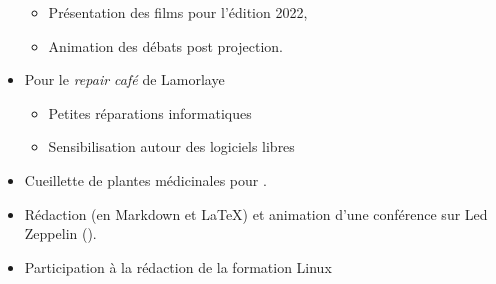\begin{itemize}
\begin{itemize}
            \item{Présentation des films pour l'édition 2022,}
            \item{Animation des débats post projection.}
        \end{itemize}
    \item{Pour le \textit{repair café}  de Lamorlaye}
        \begin{itemize}
            \item{Petites réparations informatiques}
            \item{Sensibilisation autour des logiciels libres}
        \end{itemize}
    \item{Cueillette de plantes médicinales pour }.
    \item{Rédaction (en Markdown et \LaTeX) et animation d'une conférence sur Led Zeppelin ().}
    \item{Participation à la rédaction de la formation Linux }
\end{itemize}

\newpage
{}
\newpage
\newpage
\newpage

